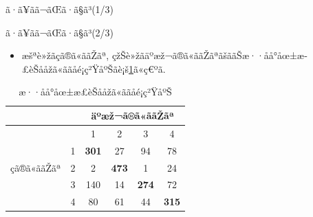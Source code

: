 \documentclass[dvipdfmx]{beamer} %
\begin{document}
\begin{frame}{ã·ã¥ãã¬ãŒã·ã§ã³(1/3)}
\begin{table}[tbp]
\begin{center}
\caption{MCMCã«ããæ··åå°åœ±æ­£èŠååžã®ãã©ã¡ãŒã¿æšå®}
\label{cross1}
\end{center}
\end{table}

\end{frame}

\begin{frame}{ã·ã¥ãã¬ãŒã·ã§ã³(2/3)}

\begin{itemize}
	\item 
	æšªè»žãçã®ã«ããŽãª, çžŠè»žãäºæž¬ã®ã«ããŽãªãšããŠæ··åå°åœ±æ­£èŠååžã«ããåé¡ç²ŸåºŠãè¡š\ref{cross2}ã«ç€ºã.
\end{itemize}

\begin{table}[tbp]
\begin{center}
\caption{æ··åå°åœ±æ­£èŠååžã«ããåé¡ç²ŸåºŠ}
\label{cross2}
\begin{tabular}{c|c|c c c c}
\hline
 &  & \multicolumn{4}{c}{äºæž¬ã®ã«ããŽãª} \\ \hline
 &  & 1 & 2 & 3 & 4  \\ \hline 
 & 1 &  \textbf{301} & 27  & 94 & 78 \\ 
çã®ã«ããŽãª
 & 2 & 2 & \textbf{473} & 1 & 24 \\
 & 3 & 140 & 14 & \textbf{274} &72 \\ 
 & 4 & 80 & 61 & 44 & \textbf{315} \\ 
\hline
\end{tabular}
\end{center}
\end{table}
\end{frame}
\end{document}

